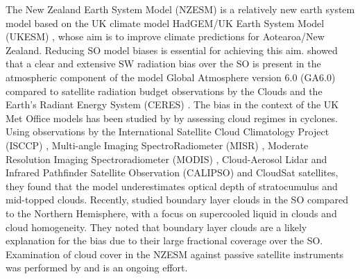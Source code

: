The New Zealand Earth System Model (NZESM)
is a relatively new earth system model based on the UK climate model HadGEM/UK Earth System Model (UKESM)
\citep{williams2016}, whose aim is to improve climate predictions for
Aotearoa/New Zealand. Reducing SO model biases is essential for
achieving this aim. \cite{walters2017}
showed that a clear and extensive SW radiation bias over the SO
is present in the atmospheric component of the model Global Atmosphere version 6.0 (GA6.0) compared to satellite
radiation budget observations by the Clouds and the Earth's Radiant Energy
System (CERES) \citep{wielicki1996}. The bias in the context of the UK Met Office
models has been studied by \cite{bodas-salcedo2012} by assessing cloud
regimes in cyclones.
Using observations by the International Satellite Cloud Climatology Project
(ISCCP) \citep{rossow1999},
Multi-angle Imaging SpectroRadiometer (MISR) \citep{diner1998}, Moderate Resolution Imaging Spectroradiometer (MODIS) \citep{salomonson2002},
Cloud-Aerosol Lidar and Infrared Pathfinder Satellite Observation
(CALIPSO) \citep{winker2010} and CloudSat \citep{stephens2002} satellites,
they found that the model underestimates optical depth of stratocumulus and
mid-topped clouds. Recently, \cite{davies2017} studied boundary layer
clouds in the SO compared to the Northern Hemisphere,
with a focus on supercooled liquid in clouds and cloud homogeneity.
They noted that boundary layer clouds are a likely explanation for the bias
due to their large fractional coverage over the SO.
Examination of cloud cover in the NZESM against passive satellite instruments
was performed by \cite{schuddeboom2017,schuddeboom2019} and is an ongoing effort.


